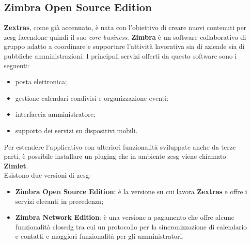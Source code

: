     \subsection{Zimbra Open Source Edition}
        \textbf{Zextras}, come già accennato, è nata con l'obiettivo di creare nuovi contenuti per \gls{zcsg} facendone quindi il suo \textit{core business}.
        \textbf{Zimbra} è un software collaborativo di gruppo adatto a coordinare e supportare l'attività lavorativa sia di aziende sia di pubbliche amministrazioni. I principali servizi offerti da questo software sono i seguenti:
        \begin{itemize}
            \item posta elettronica;
            \item gestione calendari condivisi e organizzazione eventi;
            \item interfaccia amministratore;
            \item supporto dei servizi su dispositivi mobili.
        \end{itemize}
        Per estendere l'applicativo con ulteriori funzionalità sviluppate anche da terze parti, è possibile installare un \gls{pluging} che in ambiente \gls{zcsg} viene chiamato \textbf{Zimlet}. \\
        Esistono due versioni di \gls{zcsg}:
        \begin{itemize}
            \setlength\itemsep{0em}
            \item \textbf{Zimbra Open Source Edition}: è la versione su cui lavora \textbf{Zextras} e offre i servizi elecanti in precedenza;
            \item \textbf{Zimbra Network Edition}: è una versione a pagamento che offre alcune funzionalità \gls{closedg} tra cui un protocollo per la sincronizzazione di calendario e contatti e maggiori funzionalità per gli amministratori.
        \end{itemize}
